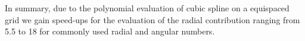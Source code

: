 In summary, due to the polynomial evaluation of cubic spline on a equispaced grid we gain speed-ups for the evaluation of the radial contribution ranging from 5.5 to 18 for commonly used radial and angular numbers.



%

%

